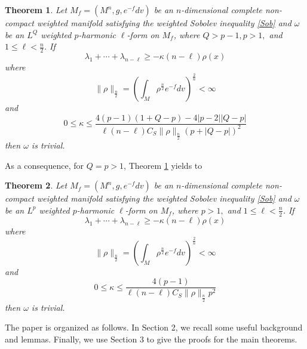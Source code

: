 \documentclass[leqno,12pt]{article} %
\theoremstyle{plain} %
\newtheorem{theorem}{\indent\sc Theorem}[section]
\theoremstyle{definition} %
\newtheorem{remark}[theorem]{\indent\sc Remark}
\numberwithin{equation}{section}
\begin{document}
\begin{theorem}\label{th3}
	Let $M_f=(M^n,g,e^{-f}dv)$ be an $n$-dimensional complete non-compact weighted manifold satisfying the weighted Sobolev inequality \eqref{Sob} and $\omega$ be an $L^Q$ weighted $p$-harmonic $\ell$-form on $M_f$, where $Q>p-1,p>1,$ and $1\le \ell < \frac{n}{2}$. 
	If	$$\lambda_1+\cdots+\lambda_{n-\ell}\ge -\kappa(n-\ell)\rho(x)	$$
	where $$\|\rho\|_{\frac{n}{2}}=\left(\int_M \rho^{\frac{n}{2}}e^{-f}dv \right)^{\frac{2}{n}}<\infty$$
	 and $$0\le \kappa\le \frac{4(p-1)(1+Q-p)-4|p-2||Q-p|}{\ell (n-\ell)C_S \|\rho\|_{\frac{n}{2}}(p+|Q-p|)^2}$$
	then $\omega$ is trivial.
\end{theorem}
As a consequence, for $Q=p>1$, Theorem \ref{th3} yields to
\begin{theorem}
	Let $M_f=(M^n,g,e^{-f}dv)$ be an $n$-dimensional complete non-compact weighted manifold satisfying the weighted Sobolev inequality \eqref{Sob} and $\omega$ be an $L^p$ weighted $p$-harmonic $\ell$-form on $M_f$, where $p>1,$ and $1\le \ell < \frac{n}{2}$. 
	If	$$\lambda_1+\cdots+\lambda_{n-\ell}\ge -\kappa(n-\ell)\rho(x)	$$
	where $$\|\rho\|_{\frac{n}{2}}=\left(\int_M \rho^{\frac{n}{2}}e^{-f}dv \right)^{\frac{2}{n}}<\infty$$
	 and $$0\le \kappa\le \frac{4(p-1)}{\ell (n-\ell)C_S \|\rho\|_{\frac{n}{2}}p^2}$$
	then $\omega$ is trivial.
\end{theorem}

The paper is organized as follows. In Section 2, we recall some useful background and lemmas. Finally, we use Section 3 to give the proofs for the main theorems.
\end{document}
